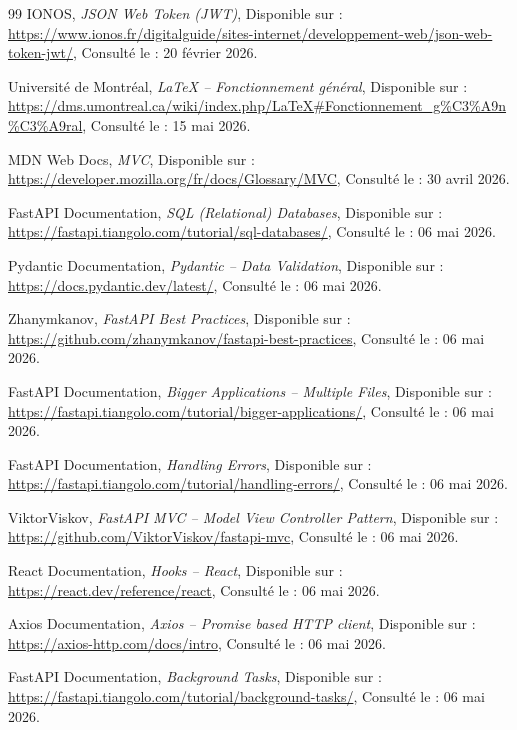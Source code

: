\documentclass[12pt, oneside, a4paper]{report}
\begin{document}
\begin{thebibliography}{99}
IONOS,
\textit{JSON Web Token (JWT)},
Disponible sur : \url{https://www.ionos.fr/digitalguide/sites-internet/developpement-web/json-web-token-jwt/},
Consulté le : 20 février 2026.

Université de Montréal,
\textit{LaTeX -- Fonctionnement général},
Disponible sur : \url{https://dms.umontreal.ca/wiki/index.php/LaTeX#Fonctionnement_g%C3%A9n%C3%A9ral},
Consulté le : 15 mai 2026.

MDN Web Docs,
\textit{MVC},
Disponible sur : \url{https://developer.mozilla.org/fr/docs/Glossary/MVC},
Consulté le : 30 avril 2026.

FastAPI Documentation,
\textit{SQL (Relational) Databases},
Disponible sur : \url{https://fastapi.tiangolo.com/tutorial/sql-databases/},
Consulté le : 06 mai 2026.

Pydantic Documentation,
\textit{Pydantic -- Data Validation},
Disponible sur : \url{https://docs.pydantic.dev/latest/},
Consulté le : 06 mai 2026.

Zhanymkanov,
\textit{FastAPI Best Practices},
Disponible sur : \url{https://github.com/zhanymkanov/fastapi-best-practices},
Consulté le : 06 mai 2026.

FastAPI Documentation,
\textit{Bigger Applications -- Multiple Files},
Disponible sur : \url{https://fastapi.tiangolo.com/tutorial/bigger-applications/},
Consulté le : 06 mai 2026.

FastAPI Documentation,
\textit{Handling Errors},
Disponible sur : \url{https://fastapi.tiangolo.com/tutorial/handling-errors/},
Consulté le : 06 mai 2026.

ViktorViskov,
\textit{FastAPI MVC -- Model View Controller Pattern},
Disponible sur : \url{https://github.com/ViktorViskov/fastapi-mvc},
Consulté le : 06 mai 2026.

React Documentation,
\textit{Hooks -- React},
Disponible sur : \url{https://react.dev/reference/react},
Consulté le : 06 mai 2026.

Axios Documentation,
\textit{Axios -- Promise based HTTP client},
Disponible sur : \url{https://axios-http.com/docs/intro},
Consulté le : 06 mai 2026.

FastAPI Documentation,
\textit{Background Tasks},
Disponible sur : \url{https://fastapi.tiangolo.com/tutorial/background-tasks/},
Consulté le : 06 mai 2026.


\end{thebibliography}
\end{document}
